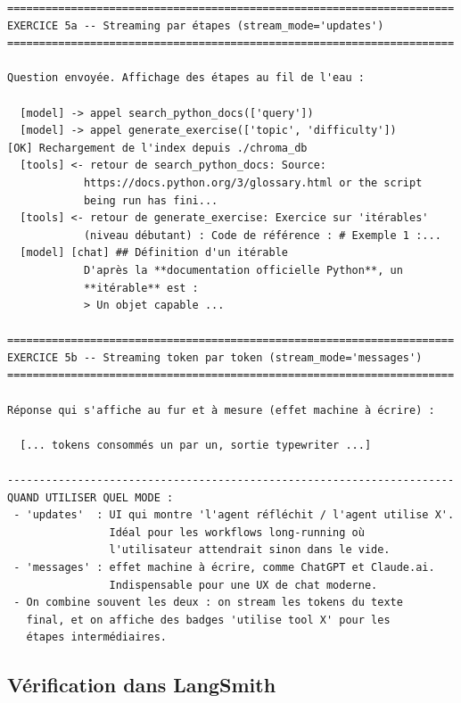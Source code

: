 \documentclass[11pt,a4paper]{article}
\begin{document}
\begin{tcolorbox}[
  colback=white,
  colframe=black!50,
  coltitle=black,
  fonttitle=\footnotesize\bfseries,
  fontupper=\footnotesize,
  title=Sortie de l'exécution,
  breakable,
]
\begin{verbatim}
======================================================================
EXERCICE 5a -- Streaming par étapes (stream_mode='updates')
======================================================================

Question envoyée. Affichage des étapes au fil de l'eau :

  [model] -> appel search_python_docs(['query'])
  [model] -> appel generate_exercise(['topic', 'difficulty'])
[OK] Rechargement de l'index depuis ./chroma_db
  [tools] <- retour de search_python_docs: Source:
            https://docs.python.org/3/glossary.html or the script
            being run has fini...
  [tools] <- retour de generate_exercise: Exercice sur 'itérables'
            (niveau débutant) : Code de référence : # Exemple 1 :...
  [model] [chat] ## Définition d'un itérable
            D'après la **documentation officielle Python**, un
            **itérable** est :
            > Un objet capable ...

======================================================================
EXERCICE 5b -- Streaming token par token (stream_mode='messages')
======================================================================

Réponse qui s'affiche au fur et à mesure (effet machine à écrire) :

  [... tokens consommés un par un, sortie typewriter ...]

----------------------------------------------------------------------
QUAND UTILISER QUEL MODE :
 - 'updates'  : UI qui montre 'l'agent réfléchit / l'agent utilise X'.
                Idéal pour les workflows long-running où
                l'utilisateur attendrait sinon dans le vide.
 - 'messages' : effet machine à écrire, comme ChatGPT et Claude.ai.
                Indispensable pour une UX de chat moderne.
 - On combine souvent les deux : on stream les tokens du texte
   final, et on affiche des badges 'utilise tool X' pour les
   étapes intermédiaires.
\end{verbatim}
\end{tcolorbox}

\subsection{Vérification dans LangSmith}
\end{document}
